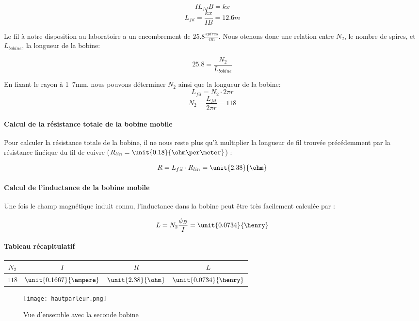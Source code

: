 $$IL_{fil}B = kx$$
$$L_{fil} = \frac{kx}{IB} = 12.6 m$$

Le fil à notre disposition au laboratoire a un encombrement de $\unit{25.8}{\frac{spires}{cm}}$. Nous otenons 
donc une relation entre $N_2$, le nombre de spires, et $L_{bobine}$, la longueur de la bobine:

$$25.8 = \frac{N_2}{L_{bobine}}$$

En fixant le rayon à \unit{1.7}{mm}, nous pouvons déterminer $N_2$ ainsi que la longueur de la bobine:
$$L_{fil} = N_2 \cdot 2\pi r$$ 
$$N_2 =  \frac{L_{fil}}{2\pi r} = 118$$


\paragraph{Calcul de la résistance totale de la bobine mobile}
Pour calculer la résistance totale de la bobine, il ne nous reste plus qu'à multiplier la longueur de fil trouvée 
précédemment par la résistance linéique du fil de cuivre
($R_{lin} = \unit{0.18}{\ohm\per\meter}$) :

$$R = L_{fil} \cdot R_{lin} = \unit{2.38}{\ohm}$$

\paragraph{Calcul de l'inductance de la bobine mobile}

Une fois le champ magnétique induit connu, l'inductance dans la bobine peut être très facilement calculée par :

$$L = N_2 \frac{\phi_B}{I} = \unit{0.0734}{\henry}$$

\paragraph{Tableau récapitulatif}

\begin{center}
	\begin{tabular}{c|c|c|c}
		$N_2$ & $I$ & $R$ & $L$ \\
		\hline
		 $118$ & $\unit{0.1667}{\ampere}$ & $\unit{2.38}{\ohm}$ & $\unit{0.0734}{\henry}$ \\
	\end{tabular}
\end{center}

\begin{figure}[ht!]
\centering
\texttt{[image: hautparleur.png]}
\caption{Vue d'ensemble avec la seconde bobine}
\label{Vue d'ensemble avec la seconde bobine}
\end{figure}

